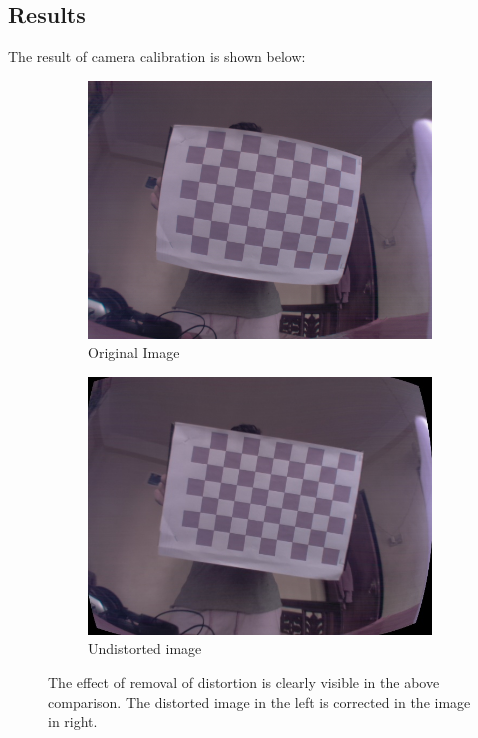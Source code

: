 \documentclass[12pt, a4paper, font = Times New Roman]{article}
\begin{document}
\subsection{Results}
The result of camera calibration is shown below:

\begin{figure}[!h]
  \begin{subfigure}[b]{0.6\textwidth}
    \includegraphics[width=\textwidth]{imagelack10000007.jpg}
    \caption{Original Image}
    \label{fig:original}
  \end{subfigure}
  \hfill
  \begin{subfigure}[b]{0.6\textwidth}
    \includegraphics[width=\textwidth]{pqr.jpg}
    \caption{Undistorted image}
    \label{fig:undistorted}
  \end{subfigure}
  \caption{The effect of removal of distortion is clearly visible in the above comparison. The distorted image in the left is corrected in the image in right.}
\end{figure}
\clearpage
\end{document}
